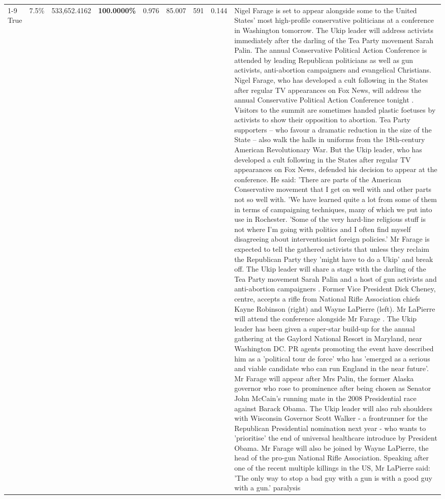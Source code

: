 \begin{table}[H]
\begin{tabular}{lllrlllll}
\cline{1-9} \cline{2-9}
True & 7.5\% & 533,652.4162 & \bfseries \color{red} 100.0000\% & 0.976 & 85.007 & 591 & 0.144 & Nigel Farage is set to appear alongside some to the United States' most high-profile conservative politicians at a conference in Washington tomorrow. The Ukip leader will address activists immediately after the darling of the Tea Party movement Sarah Palin. The annual Conservative Political Action Conference is attended by leading Republican politicians as well as gun activists, anti-abortion campaigners and evangelical Christians. Nigel Farage, who has developed a cult following in the States after regular TV appearances on Fox News, will address the annual Conservative Political Action Conference tonight . Visitors to the summit are sometimes handed plastic foetuses by activists to show their opposition to abortion. Tea Party supporters – who favour a dramatic reduction in the size of the State – also walk the halls in uniforms from the 18th-century American Revolutionary War. But the Ukip leader, who has developed a cult following in the States after regular TV appearances on Fox News, defended his decision to appear at the conference. He said: 'There are parts of the American Conservative movement that I get on well with and other parts not so well with. 'We have learned quite a lot from some of them in terms of campaigning techniques, many of which we put into use in Rochester. 'Some of the very hard-line religious stuff is not where I'm going with politics and I often find myself disagreeing about interventionist foreign policies.' Mr Farage is expected to tell the gathered activists that unless they reclaim the Republican Party they 'might have to do a Ukip' and break off. The Ukip leader will share a stage with the darling of the Tea Party movement Sarah Palin and a host of gun activists and anti-abortion campaigners . Former Vice President Dick Cheney, centre, accepts a rifle from National Rifle Association chiefs Kayne Robinson (right) and Wayne LaPierre (left). Mr LaPierre will attend the conference alongside Mr Farage . The Ukip leader has been given a super-star build-up for the annual gathering at the Gaylord National Resort in Maryland, near Washington DC. PR agents promoting the event have described him as a 'political tour de force' who has 'emerged as a serious and viable candidate who can run England in the near future'. Mr Farage will appear after Mrs Palin, the former Alaska governor who rose to prominence after being chosen as Senator John McCain's running mate in the 2008 Presidential race against Barack Obama. The Ukip leader will also rub shoulders with Wisconsin Governor Scott Walker - a frontrunner for the Republican Presidential nomination next year - who wants to 'prioritise' the end of universal healthcare introduce by President Obama. Mr Farage will also be joined by Wayne LaPierre, the head of the pro-gun National Rifle Association. Speaking after one of the recent multiple killings in the US, Mr LaPierre said: 'The only way to stop a bad guy with a gun is with a good guy with a gun.' paralysis \\

\end{tabular}
\end{table}
